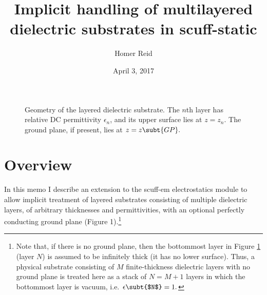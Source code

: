 \documentclass[letterpaper]{article}
\title {Implicit handling of multilayered dielectric substrates 
        in {\sc scuff-static}
       }
\author {Homer Reid}
\date {April 3, 2017}
\begin{document}
\pagestyle{myheadings}
\maketitle

\tableofcontents

\newpage
\begin{figure}
\begin{center}
\caption{Geometry of the layered dielectric substrate. The $n$th layer
has relative DC permittivity $\epsilon_n$, and its upper surface
lies at $z=z_n$. The ground plane, if present, lies
at $z=z\subt{GP}.$}
\label{SubstrateGeometryFigure}
\end{center}
\end{figure}
\section{Overview}

In this memo I describe an extension to the {\sc scuff-em}
electrostatics module to allow implicit treatment of
layered substrates consisting of multiple dielectric layers,
of arbitrary thicknesses and permittivities, with an optional
perfectly conducting ground plane (Figure 1).\footnote{Note 
that, if there is no ground plane, then the bottommost 
layer in Figure \ref{SubstrateGeometryFigure}
(layer $N$) is assumed
to be infinitely thick (it has no lower surface). Thus, a physical 
substrate consisting of $M$ finite-thickness dielectric layers with 
no ground plane is treated here as a stack of $N=M+1$ layers in which
the bottommost layer is vacuum, i.e. $\epsilon\subt{$N$}=1.$}
\end{document}
